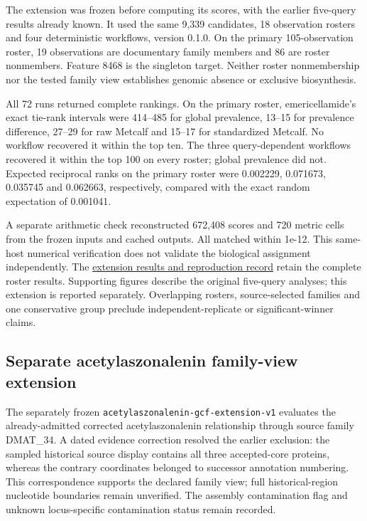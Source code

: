 \documentclass[
  10pt,
  a4paper,
]{article}
\begin{document}
The extension was frozen before computing its scores, with the earlier five-query results already known. It used the same 9,339 candidates, 18 observation rosters and four deterministic workflows, version 0.1.0. On the primary 105-observation roster, 19 observations are documentary family members and 86 are roster nonmembers. Feature 8468 is the singleton target. Neither roster nonmembership nor the tested family view establishes genomic absence or exclusive biosynthesis.

All 72 runs returned complete rankings. On the primary roster, emericellamide's exact tie-rank intervals were 414--485 for global prevalence, 13--15 for prevalence difference, 27--29 for raw Metcalf and 15--17 for standardized Metcalf. No workflow recovered it within the top ten. The three query-dependent workflows recovered it within the top 100 on every roster; global prevalence did not. Expected reciprocal ranks on the primary roster were 0.002229, 0.071673, 0.035745 and 0.062663, respectively, compared with the exact random expectation of 0.001041.

A separate arithmetic check reconstructed 672,408 scores and 720 metric cells from the frozen inputs and cached outputs. All matched within 1e-12. This same-host numerical verification does not validate the biological assignment independently. The \href{https://github.com/vinvomero/fungallink-benchmark/blob/main/manuscript/emericellamide-extension-results-2026-10-08.md}{extension results and reproduction record} retain the complete roster results. Supporting figures describe the original five-query analyses; this extension is reported separately. Overlapping rosters, source-selected families and one conservative group preclude independent-replicate or significant-winner claims.

\subsection{Separate acetylaszonalenin family-view extension}\label{separate-acetylaszonalenin-family-view-extension}

The separately frozen \nolinkurl{acetylaszonalenin-gcf-extension-v1} evaluates the already-admitted corrected acetylaszonalenin relationship through source family DMAT\_34. A dated evidence correction resolved the earlier exclusion: the sampled historical source display contains all three accepted-core proteins, whereas the contrary coordinates belonged to successor annotation numbering. This correspondence supports the declared family view; full historical-region nucleotide boundaries remain unverified. The assembly contamination flag and unknown locus-specific contamination status remain recorded.
\end{document}
